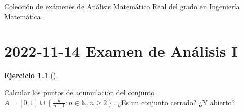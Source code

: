 \documentclass[
  spanish,
  a4paper,
]{scrreport}
\theoremstyle{definition}
\newtheorem{exercise}{Ejercicio}[chapter]
\theoremstyle{remark}
\begin{document}

Colección de exámenes de Análisis Matemático Real del grado en
Ingeniería Matemática.


\chapter{\texorpdfstring{2022-11-14 Examen de Análisis
I}{2022-11-14  Examen de Análisis I}}\label{examen-de-anuxe1lisis-i}

\begin{exercise}[]\protect\hypertarget{exr-1}{}\label{exr-1}

Calcular los puntos de acumulación del conjunto
\(A=[0,1]\cup \left\{\frac{n}{n-1}: n\in\mathbb{N}, n\geq 2\right\}\).
¿Es un conjunto cerrado? ¿Y abierto?

\end{exercise}
\end{document}
